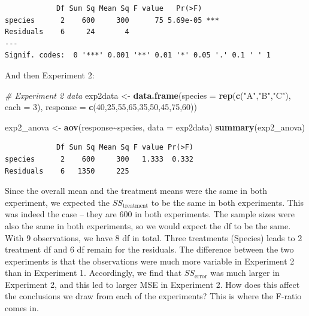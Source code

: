 \documentclass[
  letterpaper,
]{book}
\newenvironment{Shaded}{\begin{snugshade}}{\end{snugshade}}
\newcommand{\AttributeTok}[1]{\textcolor[rgb]{0.13,0.29,0.53}{#1}}
\newcommand{\CommentTok}[1]{\textcolor[rgb]{0.56,0.35,0.01}{\textit{#1}}}
\newcommand{\DecValTok}[1]{\textcolor[rgb]{0.00,0.00,0.81}{#1}}
\newcommand{\FunctionTok}[1]{\textcolor[rgb]{0.13,0.29,0.53}{\textbf{#1}}}
\newcommand{\NormalTok}[1]{#1}
\newcommand{\OtherTok}[1]{\textcolor[rgb]{0.56,0.35,0.01}{#1}}
\newcommand{\SpecialCharTok}[1]{\textcolor[rgb]{0.81,0.36,0.00}{\textbf{#1}}}
\newcommand{\StringTok}[1]{\textcolor[rgb]{0.31,0.60,0.02}{#1}}
\begin{document}
\begin{verbatim}
            Df Sum Sq Mean Sq F value   Pr(>F)    
species      2    600     300      75 5.69e-05 ***
Residuals    6     24       4                     
---
Signif. codes:  0 '***' 0.001 '**' 0.01 '*' 0.05 '.' 0.1 ' ' 1
\end{verbatim}

And then Experiment 2:

\begin{Shaded}
\begin{Highlighting}[]
\CommentTok{\# Experiment 2 data }
\NormalTok{exp2data }\OtherTok{\textless{}{-}} \FunctionTok{data.frame}\NormalTok{(}\AttributeTok{species =} \FunctionTok{rep}\NormalTok{(}\FunctionTok{c}\NormalTok{(}\StringTok{"A"}\NormalTok{,}\StringTok{"B"}\NormalTok{,}\StringTok{"C"}\NormalTok{), }\AttributeTok{each =} \DecValTok{3}\NormalTok{),}
                       \AttributeTok{response =} \FunctionTok{c}\NormalTok{(}\DecValTok{40}\NormalTok{,}\DecValTok{25}\NormalTok{,}\DecValTok{55}\NormalTok{,}\DecValTok{65}\NormalTok{,}\DecValTok{35}\NormalTok{,}\DecValTok{50}\NormalTok{,}\DecValTok{45}\NormalTok{,}\DecValTok{75}\NormalTok{,}\DecValTok{60}\NormalTok{))}

\NormalTok{exp2\_anova }\OtherTok{\textless{}{-}} \FunctionTok{aov}\NormalTok{(response}\SpecialCharTok{\textasciitilde{}}\NormalTok{species, }\AttributeTok{data =}\NormalTok{ exp2data)}
\FunctionTok{summary}\NormalTok{(exp2\_anova)}
\end{Highlighting}
\end{Shaded}

\begin{verbatim}
            Df Sum Sq Mean Sq F value Pr(>F)
species      2    600     300   1.333  0.332
Residuals    6   1350     225               
\end{verbatim}

Since the overall mean and the treatment means were the same in both
experiment, we expected the \(SS_{\text{treatment}}\) to be the same in
both experiments. This was indeed the case -- they are 600 in both
experiments. The sample sizes were also the same in both experiments, so
we would expect the df to be the same. With 9 observations, we have 8 df
in total. Three treatments (Species) leads to 2 treatment df and 6 df
remain for the residuals. The difference between the two experiments is
that the observations were much more variable in Experiment 2 than in
Experiment 1. Accordingly, we find that \(SS_{\text{error}}\) was much
larger in Experiment 2, and this led to larger MSE in Experiment 2. How
does this affect the conclusions we draw from each of the experiments?
This is where the F-ratio comes in.
\end{document}
